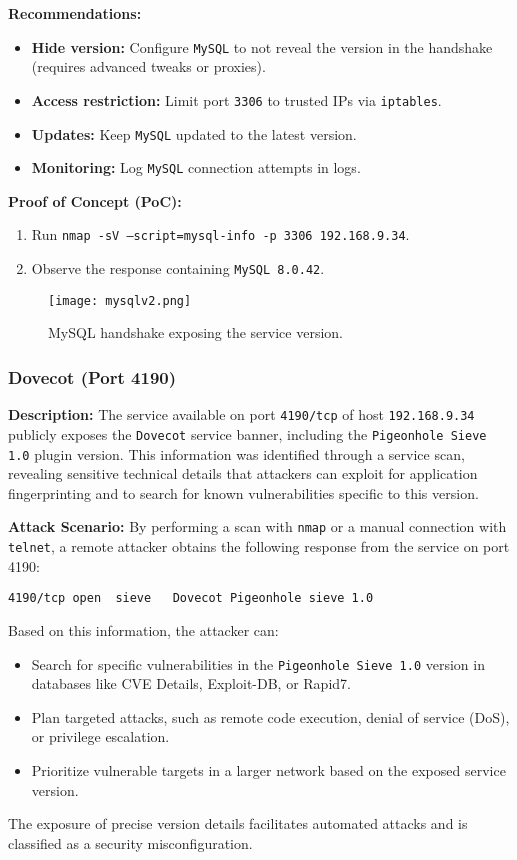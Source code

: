 \documentclass[a4paper,12pt]{article}
\begin{document}
\textbf{Recommendations:}  
\begin{itemize}
    \item \textbf{Hide version:} Configure \texttt{MySQL} to not reveal the version in the handshake (requires advanced tweaks or proxies).  
    \item \textbf{Access restriction:} Limit port \texttt{3306} to trusted IPs via \texttt{iptables}.  
    \item \textbf{Updates:} Keep \texttt{MySQL} updated to the latest version.  
    \item \textbf{Monitoring:} Log \texttt{MySQL} connection attempts in logs.  
\end{itemize}

\textbf{Proof of Concept (PoC):}  
\begin{enumerate}
    \item Run \texttt{nmap -sV --script=mysql-info -p 3306 192.168.9.34}.  
    \item Observe the response containing \texttt{MySQL 8.0.42}.  
\end{enumerate}

\begin{figure}[ht]
    \centering
    \texttt{[image: mysqlv2.png]}
    \caption{MySQL handshake exposing the service version.}
\end{figure}

\clearpage

\subsubsection{Dovecot (Port 4190)}
\textbf{Description:}  
The service available on port \texttt{4190/tcp} of host \texttt{192.168.9.34} publicly exposes the \texttt{Dovecot} service banner, including the \texttt{Pigeonhole Sieve 1.0} plugin version. This information was identified through a service scan, revealing sensitive technical details that attackers can exploit for application fingerprinting and to search for known vulnerabilities specific to this version.

\textbf{Attack Scenario:}  
By performing a scan with \texttt{nmap} or a manual connection with \texttt{telnet}, a remote attacker obtains the following response from the service on port 4190:
\begin{verbatim}
4190/tcp open  sieve   Dovecot Pigeonhole sieve 1.0
\end{verbatim}
Based on this information, the attacker can:
\begin{itemize}
    \item Search for specific vulnerabilities in the \texttt{Pigeonhole Sieve 1.0} version in databases like CVE Details, Exploit-DB, or Rapid7.  
    \item Plan targeted attacks, such as remote code execution, denial of service (DoS), or privilege escalation.  
    \item Prioritize vulnerable targets in a larger network based on the exposed service version.  
\end{itemize}
The exposure of precise version details facilitates automated attacks and is classified as a security misconfiguration.
\end{document}
